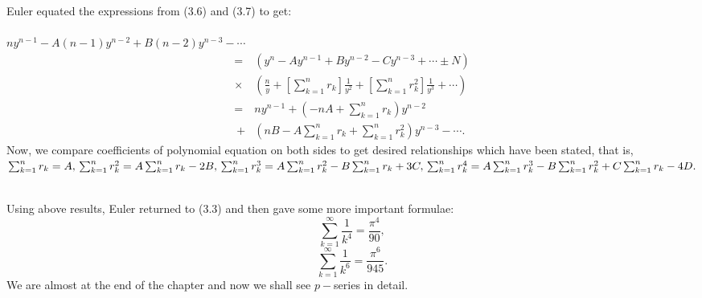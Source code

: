 \documentclass[a4paper,reqno,11pt]{amsart}
\theoremstyle{plain}%
\begin{document}
\begin{Proof}
\begin{Proof}
Euler equated the expressions from (3.6) and (3.7) to get:\\
\\
$ny^{n-1} - A(n-1)y^{n-2} + B(n-2)y^{n-3} - \cdots$
\begin{align*}
=& (y^n - Ay^{n-1} + By^{n-2} - Cy^{n-3} + \cdots \pm N)\\ \times&  \left(\frac{n}{y} + [\sum_{k=1}^{n}r_{k}]\frac{1}{y^2} + [\sum_{k=1}^{n}r_{k}^2]\frac{1}{y^3} + \cdots\right)\\
=& ny^{n-1} + \left(-nA + \sum_{k=1}^{n}r_{k}\right)y^{n-2}\\\ +& \left(nB -A\sum_{k=1}^{n}r_{k} + \sum_{k=1}^{n}r_{k}^2\right)y^{n-3} - \cdots.
\end{align*}
Now, we compare coefficients of polynomial equation on both sides to get desired relationships which have been stated, that is,\\
$\sum_{k=1}^{n}r_{k} = A,\\
\sum_{k=1}^{n}r_{k}^2 = A\sum_{k=1}^{n}r_{k} - 2B,\\
\sum_{k=1}^{n}r_{k}^3 = A\sum_{k=1}^{n}r_{k}^2 - B\sum_{k=1}^{n}r_{k} + 3C,\\
\sum_{k=1}^{n}r_{k}^4 = A\sum_{k=1}^{n}r_{k}^3 -B\sum_{k=1}^{n}r_{k}^2 + C\sum_{k=1}^{n}r_{k} - 4D.$
\end{Proof}
\\
Using above results, Euler returned to (3.3) and then gave some more important formulae:
$$\sum_{k=1}^{\infty}\frac{1}{k^4} = \frac{\pi^4}{90},$$
$$\sum_{k=1}^{\infty}\frac{1}{k^6} = \frac{\pi^6}{945}.$$
We are almost at the end of the chapter and now we shall see $p-$series in detail.\\

\end{Proof}
\end{document}
